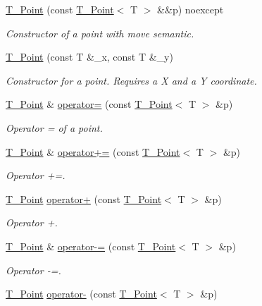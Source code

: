 \begin{DoxyCompactItemize}
\hyperlink{classT__Point_af6c471d7e5547576a6c379930b9d1d35}{T\+\_\+\+Point} (const \hyperlink{classT__Point}{T\+\_\+\+Point}$<$ T $>$ \&\&p) noexcept
\begin{DoxyCompactList}\small\item\em Constructor of a point with move semantic. \end{DoxyCompactList}\item 
\hyperlink{classT__Point_a12f2ef3c5f10e162dcb6385bbfbfae58}{T\+\_\+\+Point} (const T \&\+\_\+x, const T \&\+\_\+y)
\begin{DoxyCompactList}\small\item\em Constructor for a point. Requires a X and a Y coordinate. \end{DoxyCompactList}\item 
\hyperlink{classT__Point}{T\+\_\+\+Point} \& \hyperlink{classT__Point_a13fbb5646f2333aa41194d648423e10f}{operator=} (const \hyperlink{classT__Point}{T\+\_\+\+Point}$<$ T $>$ \&p)
\begin{DoxyCompactList}\small\item\em Operator = of a point. \end{DoxyCompactList}\item 
\hyperlink{classT__Point}{T\+\_\+\+Point} \& \hyperlink{classT__Point_a4fa7b8ceb837c81e608d5ddad0f1ffe7}{operator+=} (const \hyperlink{classT__Point}{T\+\_\+\+Point}$<$ T $>$ \&p)
\begin{DoxyCompactList}\small\item\em Operator +=. \end{DoxyCompactList}\item 
\hyperlink{classT__Point}{T\+\_\+\+Point} \hyperlink{classT__Point_a1f94a7a19cc8711e7784f700ea59297a}{operator+} (const \hyperlink{classT__Point}{T\+\_\+\+Point}$<$ T $>$ \&p)
\begin{DoxyCompactList}\small\item\em Operator +. \end{DoxyCompactList}\item 
\hyperlink{classT__Point}{T\+\_\+\+Point} \& \hyperlink{classT__Point_aa438de3090999e1f24f0de58dc5171a0}{operator-\/=} (const \hyperlink{classT__Point}{T\+\_\+\+Point}$<$ T $>$ \&p)
\begin{DoxyCompactList}\small\item\em Operator -\/=. \end{DoxyCompactList}\item 
\hyperlink{classT__Point}{T\+\_\+\+Point} \hyperlink{classT__Point_a4a3671d0a9763b3e749c799294ebb1ca}{operator-\/} (const \hyperlink{classT__Point}{T\+\_\+\+Point}$<$ T $>$ \&p)

\end{DoxyCompactItemize}
